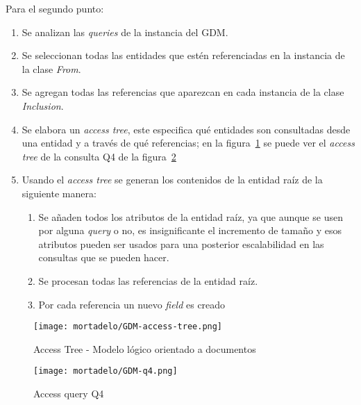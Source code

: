Para el segundo punto:
\begin{enumerate}
    \item Se analizan las \textit{queries} de la instancia del GDM.
    \item Se seleccionan todas las entidades que estén referenciadas en la instancia de la clase \textit{From}.
    \item Se agregan todas las referencias que aparezcan en cada instancia de la clase \textit{Inclusion}.
    \item Se elabora un \textit{access tree}, este especifica qué entidades son consultadas desde una entidad y a través de qué referencias; en la figura~\ref{img:mortadelo-gdm-logical-model-access-tree} se puede ver el \textit{access tree} de la consulta Q4 de la figura~\ref{img:mortadelo-gdm-logical-model-q4}
    \item Usando el \textit{access tree} se generan los contenidos de la entidad raíz de la siguiente manera:
    \begin{enumerate}
        \item Se añaden todos los atributos de la entidad raíz, ya que aunque se usen por alguna \textit{query} o no, es insignificante el incremento de tamaño y esos atributos pueden ser usados para una posterior escalabilidad en las consultas que se pueden hacer.
        \item Se procesan todas las referencias de la entidad raíz.
        \item Por cada referencia un nuevo \textit{field} es creado
    \end{enumerate}
\end{enumerate}

\begin{figure}[h!t] 
    \centering
    \texttt{[image: mortadelo/GDM-access-tree.png]}
    \caption{Access Tree - Modelo lógico orientado a documentos}
    \label{img:mortadelo-gdm-logical-model-access-tree}
\end{figure}

\begin{figure}[h!t] 
    \centering
    \texttt{[image: mortadelo/GDM-q4.png]}
    \caption{Access query Q4}
    \label{img:mortadelo-gdm-logical-model-q4}
\end{figure}

